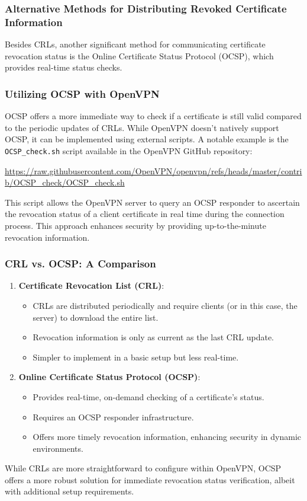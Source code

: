 \subsubsection{Alternative Methods for Distributing Revoked Certificate Information}

Besides CRLs, another significant method for communicating certificate revocation status is the Online Certificate Status Protocol (OCSP), which provides real-time status checks.

\subsubsection{Utilizing OCSP with OpenVPN}

OCSP offers a more immediate way to check if a certificate is still valid compared to the periodic updates of CRLs. While OpenVPN doesn't natively support OCSP, it can be implemented using external scripts. A notable example is the \texttt{OCSP\_check.sh} script available in the OpenVPN GitHub repository:

\url{https://raw.githubusercontent.com/OpenVPN/openvpn/refs/heads/master/contrib/OCSP_check/OCSP_check.sh}

This script allows the OpenVPN server to query an OCSP responder to ascertain the revocation status of a client certificate in real time during the connection process. This approach enhances security by providing up-to-the-minute revocation information.

\subsubsection{CRL vs. OCSP: A Comparison}

\begin{enumerate}
\item \textbf{Certificate Revocation List (CRL)}:
\begin{itemize}
\item CRLs are distributed periodically and require clients (or in this case, the server) to download the entire list.
\item Revocation information is only as current as the last CRL update.
\item Simpler to implement in a basic setup but less real-time.
\end{itemize}

\item \textbf{Online Certificate Status Protocol (OCSP)}:
\begin{itemize}
    \item Provides real-time, on-demand checking of a certificate's status.
    \item Requires an OCSP responder infrastructure.
    \item Offers more timely revocation information, enhancing security in dynamic environments.
\end{itemize}
\end{enumerate}

While CRLs are more straightforward to configure within OpenVPN, OCSP offers a more robust solution for immediate revocation status verification, albeit with additional setup requirements.
